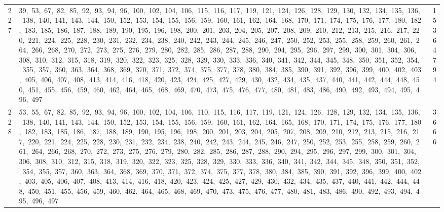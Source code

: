 \begin{longtable}{c|p{}|r}
227 & 39,\ 53,\ 67,\ 82,\ 85,\ 92,\ 93,\ 94,\ 96,\ 100,\ 102,\ 104,\ 106,\ 115,\ 116,\ 117,\ 119,\ 121,\ 124,\ 126,\ 128,\ 129,\ 130,\ 132,\ 134,\ 135,\ 136,\ 138,\ 140,\ 141,\ 143,\ 144,\ 150,\ 152,\ 153,\ 154,\ 155,\ 156,\ 159,\ 160,\ 161,\ 162,\ 164,\ 168,\ 170,\ 171,\ 174,\ 175,\ 176,\ 177,\ 180,\ 182,\ 183,\ 185,\ 186,\ 187,\ 188,\ 189,\ 190,\ 195,\ 196,\ 198,\ 200,\ 201,\ 203,\ 204,\ 205,\ 207,\ 208,\ 209,\ 210,\ 212,\ 213,\ 215,\ 216,\ 217,\ 220,\ 221,\ 224,\ 225,\ 228,\ 230,\ 231,\ 232,\ 234,\ 238,\ 240,\ 242,\ 243,\ 244,\ 245,\ 246,\ 247,\ 250,\ 252,\ 253,\ 255,\ 258,\ 259,\ 260,\ 261,\ 264,\ 266,\ 268,\ 270,\ 272,\ 273,\ 275,\ 276,\ 279,\ 280,\ 282,\ 285,\ 286,\ 287,\ 288,\ 290,\ 294,\ 295,\ 296,\ 297,\ 299,\ 300,\ 301,\ 304,\ 306,\ 308,\ 310,\ 312,\ 315,\ 318,\ 319,\ 320,\ 322,\ 323,\ 325,\ 328,\ 329,\ 330,\ 333,\ 336,\ 340,\ 341,\ 342,\ 344,\ 345,\ 348,\ 350,\ 351,\ 352,\ 354,\ 355,\ 357,\ 360,\ 363,\ 364,\ 368,\ 369,\ 370,\ 371,\ 372,\ 374,\ 375,\ 377,\ 378,\ 380,\ 384,\ 385,\ 390,\ 391,\ 392,\ 396,\ 399,\ 400,\ 402,\ 403,\ 405,\ 406,\ 407,\ 408,\ 413,\ 414,\ 416,\ 418,\ 420,\ 423,\ 424,\ 425,\ 427,\ 429,\ 430,\ 432,\ 434,\ 435,\ 437,\ 440,\ 441,\ 442,\ 444,\ 448,\ 450,\ 451,\ 455,\ 456,\ 459,\ 460,\ 462,\ 464,\ 465,\ 468,\ 469,\ 470,\ 473,\ 475,\ 476,\ 477,\ 480,\ 481,\ 483,\ 486,\ 490,\ 492,\ 493,\ 494,\ 495,\ 496,\ 497 & 15364794 \\
228 & 53,\ 55,\ 67,\ 82,\ 85,\ 92,\ 93,\ 94,\ 96,\ 100,\ 102,\ 104,\ 106,\ 110,\ 115,\ 116,\ 117,\ 119,\ 121,\ 124,\ 126,\ 128,\ 129,\ 132,\ 134,\ 135,\ 136,\ 138,\ 140,\ 141,\ 143,\ 144,\ 150,\ 152,\ 153,\ 154,\ 155,\ 156,\ 159,\ 160,\ 161,\ 162,\ 164,\ 165,\ 168,\ 170,\ 171,\ 174,\ 175,\ 176,\ 177,\ 180,\ 182,\ 183,\ 185,\ 186,\ 187,\ 188,\ 189,\ 190,\ 195,\ 196,\ 198,\ 200,\ 201,\ 203,\ 204,\ 205,\ 207,\ 208,\ 209,\ 210,\ 212,\ 213,\ 215,\ 216,\ 217,\ 220,\ 221,\ 224,\ 225,\ 228,\ 230,\ 231,\ 232,\ 234,\ 238,\ 240,\ 242,\ 243,\ 244,\ 245,\ 246,\ 247,\ 250,\ 252,\ 253,\ 255,\ 258,\ 259,\ 260,\ 261,\ 264,\ 266,\ 268,\ 270,\ 272,\ 273,\ 275,\ 276,\ 279,\ 280,\ 282,\ 285,\ 286,\ 287,\ 288,\ 290,\ 294,\ 295,\ 296,\ 297,\ 299,\ 300,\ 301,\ 304,\ 306,\ 308,\ 310,\ 312,\ 315,\ 318,\ 319,\ 320,\ 322,\ 323,\ 325,\ 328,\ 329,\ 330,\ 333,\ 336,\ 340,\ 341,\ 342,\ 344,\ 345,\ 348,\ 350,\ 351,\ 352,\ 354,\ 355,\ 357,\ 360,\ 363,\ 364,\ 368,\ 369,\ 370,\ 371,\ 372,\ 374,\ 375,\ 377,\ 378,\ 380,\ 384,\ 385,\ 390,\ 391,\ 392,\ 396,\ 399,\ 400,\ 402,\ 403,\ 405,\ 406,\ 407,\ 408,\ 413,\ 414,\ 416,\ 418,\ 420,\ 423,\ 424,\ 425,\ 427,\ 429,\ 430,\ 432,\ 434,\ 435,\ 437,\ 440,\ 441,\ 442,\ 444,\ 448,\ 450,\ 451,\ 455,\ 456,\ 459,\ 460,\ 462,\ 464,\ 465,\ 468,\ 469,\ 470,\ 473,\ 475,\ 476,\ 477,\ 480,\ 481,\ 483,\ 486,\ 490,\ 492,\ 493,\ 494,\ 495,\ 496,\ 497 & 3666 \\

\end{longtable}
